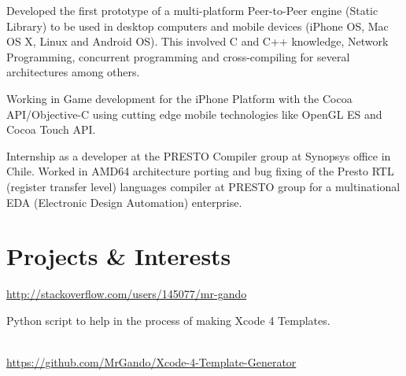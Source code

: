 \documentclass[10pt, a4paper, dvips]{moderncv}
\newcommand\Colorhref[1]{\small\textcolor{RoyalBlue}{\url{#1}}}
\begin{document}
{
\begin{scriptsize}
Developed the first prototype of a multi-platform Peer-to-Peer engine (Static Library) to be used in desktop computers and mobile devices (iPhone OS, Mac OS X, Linux and Android OS). This involved C and C++ knowledge, Network Programming, concurrent programming and cross-compiling for several architectures among others.\\
\end{scriptsize}
}

{
\begin{scriptsize}
Working in Game development for the iPhone Platform with the Cocoa API/Objective-C using cutting edge mobile technologies like OpenGL ES and Cocoa Touch API.\\
\end{scriptsize}
}

{
\begin{scriptsize}
Internship as a developer at the PRESTO Compiler group at Synopsys office in Chile. Worked in AMD64 architecture porting and bug fixing of the Presto RTL (register transfer level) languages compiler at
PRESTO group for a multinational EDA (Electronic Design Automation) enterprise.
\end{scriptsize}
}

\section{Projects \& Interests}
{
\Colorhref{http://stackoverflow.com/users/145077/mr-gando}\\
}
{
\begin{small}Python script to help in the process of making Xcode 4 Templates.\end{small}\\
\Colorhref{ https://github.com/MrGando/Xcode-4-Template-Generator}
}
\end{document}
